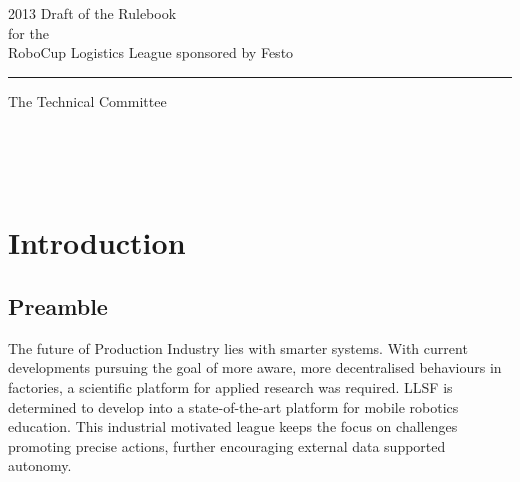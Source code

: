\documentclass[12pt,twoside]{article}
\begin{document}


\begin{titlepage}
  \vspace*{5cm}
  \begin{center}
    \begin{LARGE}
      2013 Draft of the Rulebook\\[2ex]
      for the\\[2ex]
      RoboCup Logistics League sponsored by Festo\\[4ex]
    \end{LARGE}
    \hrule
    
    \vspace*{4ex}
    \begin{Large}
      The Technical Committee\\[6ex]
    \end{Large}
  \end{center}
  \vspace*{4cm}
  
  \noindent
  \\[2ex]
  \\[2ex]
  \\[2ex]  
\end{titlepage}
\thispagestyle{empty}
\pagebreak
\cleardoublepage

\setcounter{page}{1}
\tableofcontents
\newpage
\cleardoublepage


\setcounter{page}{1}


\section{Introduction}
\subsection{Preamble}
The future of Production Industry lies with smarter systems.  With
current developments pursuing the goal of more aware, more
decentralised behaviours in factories, a scientific platform for
applied research was required.  LLSF is determined to develop into a
state-of-the-art platform for mobile robotics education. This
industrial motivated league keeps the focus on challenges promoting
precise actions, further encouraging external data supported autonomy.
\end{document}
